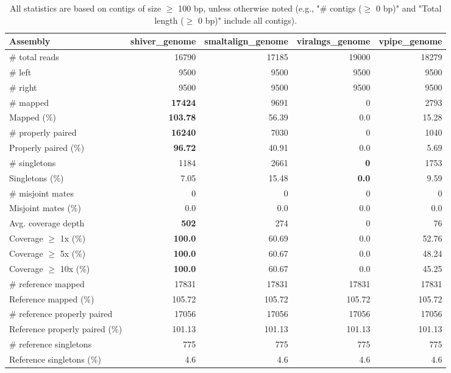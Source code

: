 \documentclass[12pt,a4paper]{article}
\begin{document}
\begin{table}[ht]
\begin{center}
\caption{All statistics are based on contigs of size $\geq$ 100 bp, unless otherwise noted (e.g., "\# contigs ($\geq$ 0 bp)" and "Total length ($\geq$ 0 bp)" include all contigs).}
\begin{tabular}{|l*{4}{|r}|}
\hline
Assembly & shiver\_genome & smaltalign\_genome & viralngs\_genome & vpipe\_genome \\ \hline
\# total reads & 16790 & 17185 & 19000 & 18279 \\ \hline
\# left & 9500 & 9500 & 9500 & 9500 \\ \hline
\# right & 9500 & 9500 & 9500 & 9500 \\ \hline
\# mapped & {\bf 17424} & 9691 & 0 & 2793 \\ \hline
Mapped (\%) & {\bf 103.78} & 56.39 & 0.0 & 15.28 \\ \hline
\# properly paired & {\bf 16240} & 7030 & 0 & 1040 \\ \hline
Properly paired (\%) & {\bf 96.72} & 40.91 & 0.0 & 5.69 \\ \hline
\# singletons & 1184 & 2661 & {\bf 0} & 1753 \\ \hline
Singletons (\%) & 7.05 & 15.48 & {\bf 0.0} & 9.59 \\ \hline
\# misjoint mates & 0 & 0 & 0 & 0 \\ \hline
Misjoint mates (\%) & 0.0 & 0.0 & 0.0 & 0.0 \\ \hline
Avg. coverage depth & {\bf 502} & 274 & 0 & 76 \\ \hline
Coverage $\geq$ 1x (\%) & {\bf 100.0} & 60.69 & 0.0 & 52.76 \\ \hline
Coverage $\geq$ 5x (\%) & {\bf 100.0} & 60.67 & 0.0 & 48.24 \\ \hline
Coverage $\geq$ 10x (\%) & {\bf 100.0} & 60.67 & 0.0 & 45.25 \\ \hline
\# reference mapped & 17831 & 17831 & 17831 & 17831 \\ \hline
Reference mapped (\%) & 105.72 & 105.72 & 105.72 & 105.72 \\ \hline
\# reference properly paired & 17056 & 17056 & 17056 & 17056 \\ \hline
Reference properly paired (\%) & 101.13 & 101.13 & 101.13 & 101.13 \\ \hline
\# reference singletons & 775 & 775 & 775 & 775 \\ \hline
Reference singletons (\%) & 4.6 & 4.6 & 4.6 & 4.6 \\ \hline

\end{tabular}
\end{center}
\end{table}
\end{document}
